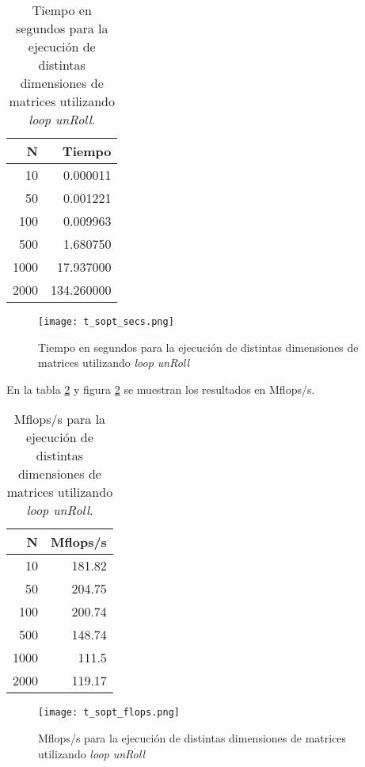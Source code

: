 \documentclass[a4paper,11pt]{article}
\begin{document}
\begin{table}
\begin{center}
\begin{tabular}{|r|r|}
\hline
         N & Tiempo \\
\hline
        10 &   0.000011 \\
\hline
        50 &   0.001221 \\
\hline
       100 &   0.009963 \\
\hline
       500 &   1.680750 \\
\hline
      1000 &   17.937000 \\
\hline
      2000 &   134.260000 \\
\hline
\end{tabular}
\caption{Tiempo en segundos para la ejecuci\'on de distintas dimensiones de matrices utilizando \emph{loop unRoll}.}\label{tabla1}
\end{center}
\end{table}

\begin{figure}
\centering
\texttt{[image: t\_sopt\_secs.png]}
\caption{Tiempo en segundos para la ejecuci\'on de distintas dimensiones de matrices utilizando \emph{loop unRoll}}\label{figura1}
\end{figure}

En la tabla \ref{tabla2} y figura \ref{figura2} se muestran los resultados en Mflops/s.

\begin{table}
\begin{center}
\begin{tabular}{|r|r|}
\hline
         N & Mflops/s \\
\hline
        10 &   181.82 \\
\hline
        50 &   204.75 \\
\hline
       100 &   200.74 \\
\hline
       500 &   148.74 \\
\hline
      1000 &   111.5 \\
\hline
      2000 &   119.17 \\
\hline
\end{tabular}
\caption{Mflops/s para la ejecuci\'on de distintas dimensiones de matrices utilizando \emph{loop unRoll}.}\label{tabla2}
\end{center}
\end{table}

\begin{figure}
\centering
\texttt{[image: t\_sopt\_flops.png]}
\caption{Mflops/s para la ejecuci\'on de distintas dimensiones de matrices utilizando \emph{loop unRoll}}\label{figura2}
\end{figure}
\end{document}
